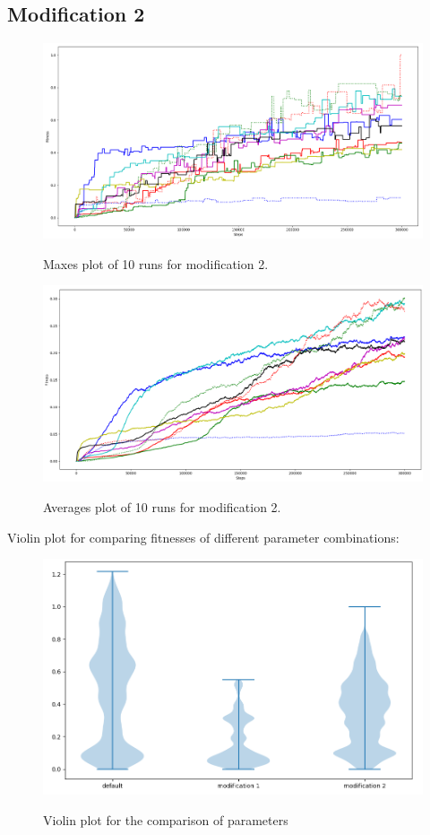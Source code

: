 \documentclass[a4]{article}
\begin{document}
\subsection{Modification 2}
\begin{figure}[H]
	\includegraphics[scale=0.31]{mod2 }
	\label{fig:m2}
	\caption{Maxes plot of 10 runs for modification 2.}
\end{figure}
\begin{figure}[H]
	\includegraphics[scale=0.31]{avmod2 }
	\label{fig:m2av}
	\caption{Averages plot of 10 runs for modification 2.}
\end{figure}
\pagebreak
Violin plot for comparing fitnesses of different parameter combinations:
\begin{figure}[H]
	\includegraphics[scale=0.5]{michalskrzypek}
	\label{fig:michalskrzypek}
	\caption{Violin plot for the comparison of parameters}
\end{figure}
\end{document}
